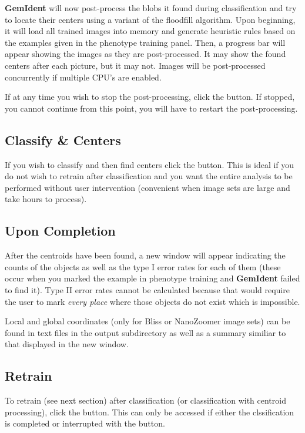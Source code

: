\documentclass[12pt]{article}
\begin{document}
{\bf GemIdent} will now post-process the blobs it found during classification and try to locate their centers using a variant of the floodfill algorithm\cite{floodfill}. Upon beginning, it will load all trained images into memory and generate heuristic rules based on the examples given in the {\sf phenotype training} panel. Then, a progress bar will appear showing the images as they are post-processed. It may show the found centers after each picture, but it may not. Images will be post-processed concurrently if multiple CPU's are enabled.

If at any time you wish to stop the post-processing, click the  button. If stopped, you cannot continue from this point, you will have to restart the post-processing.

\subsection{Classify \& Centers}

If you wish to classify and then find centers click the  button. This is ideal if you do not wish to retrain after classification and you want the entire analysis to be performed without user intervention (convenient when image sets are large and take hours to process).

\subsection{Upon Completion}

After the centroids have been found, a new window will appear indicating the counts of the objects as well as the type I error rates for each of them (these occur when you marked the example in phenotype training and {\bf GemIdent} failed to find it). Type II error rates cannot be calculated because that would require the user to mark {\emph{every place}} where those objects do not exist which is impossible. 

Local and global coordinates (only for Bliss or NanoZoomer image sets) can be found in text files in the output subdirectory as well as a summary similiar to that displayed in the new window.

\subsection{Retrain}

To retrain (see next section) after classification (or classification with centroid processing), click the  button. This can only be accessed if either the clssification is completed or interrupted with the  button.
\end{document}

